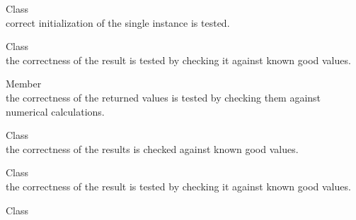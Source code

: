 \begin{DoxyRefList}
\item[Class \doxylink{class_quant_lib_1_1_seed_generator}{Quant\+Lib\+::Seed\+Generator} ]\hfill \\
\label{test__test000063}%
%
correct initialization of the single instance is tested.  
\item[Class \doxylink{class_quant_lib_1_1_segment_integral}{Quant\+Lib\+::Segment\+Integral} ]\hfill \\
\label{test__test000044}%
%
the correctness of the result is tested by checking it against known good values.  
\item[Member \doxylink{namespace_quant_lib_a7563e2b2e11d54d5a55a58ae124c3349}{Quant\+Lib\+::Sequence\+Statistics} ]\hfill \\
\label{test__test000079}%
%
the correctness of the returned values is tested by checking them against numerical calculations.  
\item[Class \doxylink{class_quant_lib_1_1_simple_day_counter}{Quant\+Lib\+::Simple\+Day\+Counter} ]\hfill \\
\label{test__test000180}%
%
the correctness of the results is checked against known good values.  
\item[Class \doxylink{class_quant_lib_1_1_simpson_integral}{Quant\+Lib\+::Simpson\+Integral} ]\hfill \\
\label{test__test000045}%
%
the correctness of the result is tested by checking it against known good values.  
\item[Class \doxylink{class_quant_lib_1_1_sobol_rsg}{Quant\+Lib\+::Sobol\+Rsg} ]\hfill \\
\label{test__test000064}%
%


\end{DoxyRefList}
